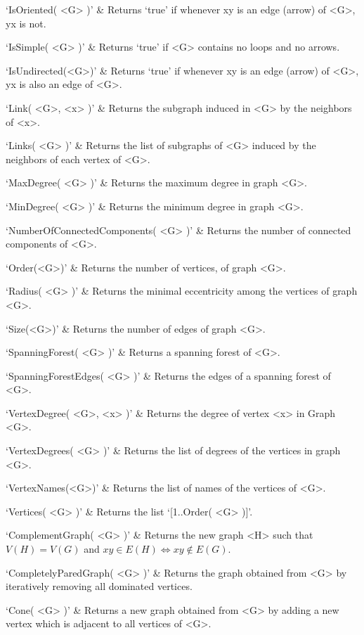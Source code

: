 `IsOriented( <G> )' & 
Returns `true' if whenever xy is an edge (arrow)  of <G>, yx is not.

`IsSimple( <G> )' & 
Returns `true' if <G> contains no loops and no arrows.

`IsUndirected(<G>)' & 
Returns `true' if whenever xy is an edge (arrow) of <G>, yx is also an edge of <G>.

`Link( <G>, <x> )' & 
Returns the subgraph induced in <G> by the neighbors of <x>.

`Links( <G> )' & 
Returns  the  list  of  subgraphs  of <G> induced by the neighbors of each vertex of <G>.

`MaxDegree( <G> )' & 
Returns the maximum degree in graph <G>.

`MinDegree( <G> )' & 
Returns the minimum degree in graph <G>.

`NumberOfConnectedComponents( <G> )' & 
Returns the number of connected components of <G>.

`Order(<G>)' & 
Returns the number of vertices, of graph <G>.

`Radius( <G> )' & 
Returns the minimal eccentricity among the vertices of graph <G>.

`Size(<G>)' & 
Returns the number of edges of graph <G>.

`SpanningForest( <G> )' & 
Returns a spanning forest of <G>.

`SpanningForestEdges( <G> )' & 
Returns the edges of a spanning forest of <G>.

`VertexDegree( <G>, <x> )' & 
Returns the degree of vertex <x> in Graph <G>.

`VertexDegrees( <G> )' & 
Returns the list of degrees of the vertices in graph <G>.

`VertexNames(<G>)' & 
Returns  the  list of names of the vertices of <G>.

`Vertices( <G> )' & 
Returns the list `[1..Order( <G> )]'.
\enditems


\beginitems
`ComplementGraph( <G> )' & 
Returns the new graph <H> such that  $V(H)=V(G)$ and $xy\in E(H) \iff xy \not\in E(G)$.

`CompletelyParedGraph( <G> )' & 
Returns the graph obtained from <G> by iteratively removing all dominated vertices. 

`Cone( <G> )' & 
Returns a new graph obtained from <G> by adding a new vertex which is adjacent to all vertices of <G>.

